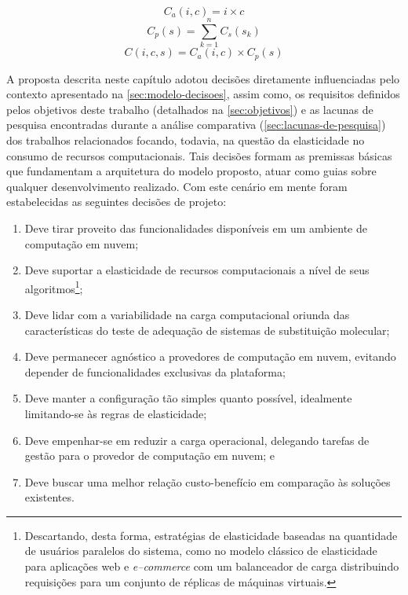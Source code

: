 \documentclass[english,brazilian]{UNISINOSmonografia} %
\begin{document}
\begin{equation}
\label{eq:custo-jmodel-arquivo}
C_a(i,c) = i \times c
\end{equation}
\begin{equation}
\label{eq:custo-jmodel-params}
C_p(s) = \sum_{k=1}^{n} C_s(s_k)
\end{equation}
\begin{equation}
\label{eq:custo-jmodel-bestfit}
C(i,c,s) = C_a(i,c) \times C_p(s)
\end{equation}


A proposta descrita neste capítulo adotou decisões diretamente influenciadas pelo contexto apresentado na \autoref{sec:modelo-decisoes}, assim como, os requisitos definidos pelos objetivos deste trabalho (detalhados na \autoref{sec:objetivos}) e as lacunas de pesquisa encontradas durante a análise comparativa (\autoref{sec:lacunas-de-pesquisa}) dos trabalhos relacionados focando, todavia, na questão da elasticidade no consumo de recursos computacionais.
Tais decisões formam as premissas básicas que fundamentam a arquitetura do modelo proposto, atuar como guias sobre qualquer desenvolvimento realizado.
Com este cenário em mente foram estabelecidas as seguintes decisões de projeto:
\begin{enumerate}[label=Decisão~\arabic*:,itemindent=*,leftmargin=*]
	\label{list:decisoes-de-projeto}
	
	\item Deve tirar proveito das funcionalidades disponíveis em um ambiente de computação em nuvem;

	\item Deve suportar a elasticidade de recursos computacionais a nível de seus algoritmos\footnote{
	Descartando, desta forma, estratégias de elasticidade baseadas na quantidade de usuários paralelos do sistema, como no modelo clássico de elasticidade para aplicações web e \textit{e--commerce} com um balanceador de carga distribuindo requisições para um conjunto de réplicas de máquinas virtuais.
};
	
	\item Deve lidar com a variabilidade na carga computacional oriunda das características do teste de adequação de sistemas de substituição molecular;
	
	\item Deve permanecer agnóstico a provedores de computação em nuvem, evitando depender de funcionalidades exclusivas da plataforma;
	
	\item Deve manter a configuração tão simples quanto possível, idealmente limitando-se às regras de elasticidade;

	\item Deve empenhar-se em reduzir a carga operacional, delegando tarefas de gestão para o provedor de computação em nuvem; e

	\item Deve buscar uma melhor relação custo-benefício em comparação às soluções existentes.
\end{enumerate}
\end{document}
